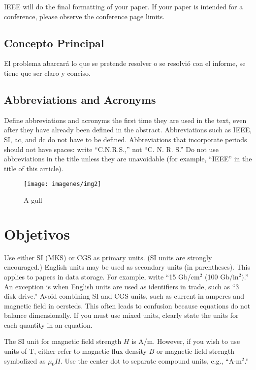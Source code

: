 \documentclass[a4paper]{IEEEtran} %
\begin{document}
IEEE will do the final formatting of your paper. If your paper is intended 
for a conference, please observe the conference page limits. 

\subsection{Concepto Principal}

El problema abarcará lo que se pretende resolver o se resolvió con el informe, se tiene que ser claro y conciso.

\subsection{Abbreviations and Acronyms}
Define abbreviations and acronyms the first time they are used in the text, 
even after they have already been defined in the abstract. Abbreviations 
such as IEEE, SI, ac, and dc do not have to be defined. Abbreviations that 
incorporate periods should not have spaces: write ``C.N.R.S.,'' not ``C. N. 
R. S.'' Do not use abbreviations in the title unless they are unavoidable 
(for example, ``IEEE'' in the title of this article).

\begin{figure}
    \centering
        \texttt{[image: imagenes/img2]}
        \caption{A gull}
        \label{fig:gull}
\end{figure}

\section{Objetivos}
Use either SI (MKS) or CGS as primary units. (SI units are strongly 
encouraged.) English units may be used as secondary units (in parentheses). 
This applies to papers in data storage. For example, write ``15 
Gb/cm$^{2}$ (100 Gb/in$^{2})$.'' An exception is when 
English units are used as identifiers in trade, such as ``3  
disk drive.'' Avoid combining SI and CGS units, such as current in amperes 
and magnetic field in oersteds. This often leads to confusion because 
equations do not balance dimensionally. If you must use mixed units, clearly 
state the units for each quantity in an equation.

The SI unit for magnetic field strength $H$ is A/m. However, if you wish to use 
units of T, either refer to magnetic flux density $B$ or magnetic field 
strength symbolized as $\mu _{0}H$. Use the center dot to separate 
compound units, e.g., ``A$\cdot $m$^{2}$.''
\end{document}
